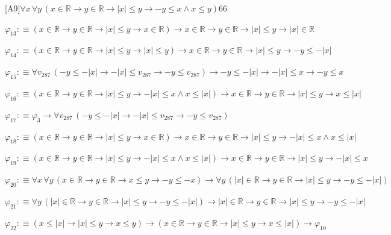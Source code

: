 \begin{fullproof}{[A9]}{$\forall x\,\forall y\,(x \in \mathbb{R} \to y \in \mathbb{R} \to \lvert x \rvert \leq y \to -y \leq x \land x \leq y)$}{66}
\begin{abbrevlist}
\item $\varphi_{13} :\equiv (x \in \mathbb{R} \to y \in \mathbb{R} \to \lvert x \rvert \leq y \to x \in \mathbb{R}) \to x \in \mathbb{R} \to y \in \mathbb{R} \to \lvert x \rvert \leq y \to \lvert x \rvert \in \mathbb{R}$
\item $\varphi_{14} :\equiv (x \in \mathbb{R} \to y \in \mathbb{R} \to \lvert x \rvert \leq y \to \lvert x \rvert \leq y) \to x \in \mathbb{R} \to y \in \mathbb{R} \to \lvert x \rvert \leq y \to -y \leq -\lvert x \rvert$
\item $\varphi_{15} :\equiv \forall v_{287}\,(-y \leq -\lvert x \rvert \to -\lvert x \rvert \leq v_{287} \to -y \leq v_{287}) \to -y \leq -\lvert x \rvert \to -\lvert x \rvert \leq x \to -y \leq x$
\item $\varphi_{16} :\equiv (x \in \mathbb{R} \to y \in \mathbb{R} \to \lvert x \rvert \leq y \to -\lvert x \rvert \leq x \land x \leq \lvert x \rvert) \to x \in \mathbb{R} \to y \in \mathbb{R} \to \lvert x \rvert \leq y \to x \leq \lvert x \rvert$
\item $\varphi_{17} :\equiv \varphi_{3} \to \forall v_{287}\,(-y \leq -\lvert x \rvert \to -\lvert x \rvert \leq v_{287} \to -y \leq v_{287})$
\item $\varphi_{18} :\equiv (x \in \mathbb{R} \to y \in \mathbb{R} \to \lvert x \rvert \leq y \to x \in \mathbb{R}) \to x \in \mathbb{R} \to y \in \mathbb{R} \to \lvert x \rvert \leq y \to -\lvert x \rvert \leq x \land x \leq \lvert x \rvert$
\item $\varphi_{19} :\equiv (x \in \mathbb{R} \to y \in \mathbb{R} \to \lvert x \rvert \leq y \to -\lvert x \rvert \leq x \land x \leq \lvert x \rvert) \to x \in \mathbb{R} \to y \in \mathbb{R} \to \lvert x \rvert \leq y \to -\lvert x \rvert \leq x$
\item $\varphi_{20} :\equiv \forall x\,\forall y\,(x \in \mathbb{R} \to y \in \mathbb{R} \to x \leq y \to -y \leq -x) \to \forall y\,(\lvert x \rvert \in \mathbb{R} \to y \in \mathbb{R} \to \lvert x \rvert \leq y \to -y \leq -\lvert x \rvert)$
\item $\varphi_{21} :\equiv \forall y\,(\lvert x \rvert \in \mathbb{R} \to y \in \mathbb{R} \to \lvert x \rvert \leq y \to -y \leq -\lvert x \rvert) \to \lvert x \rvert \in \mathbb{R} \to y \in \mathbb{R} \to \lvert x \rvert \leq y \to -y \leq -\lvert x \rvert$
\item $\varphi_{22} :\equiv (x \leq \lvert x \rvert \to \lvert x \rvert \leq y \to x \leq y) \to (x \in \mathbb{R} \to y \in \mathbb{R} \to \lvert x \rvert \leq y \to x \leq \lvert x \rvert) \to \varphi_{10}$

\end{abbrevlist}
\end{fullproof}
